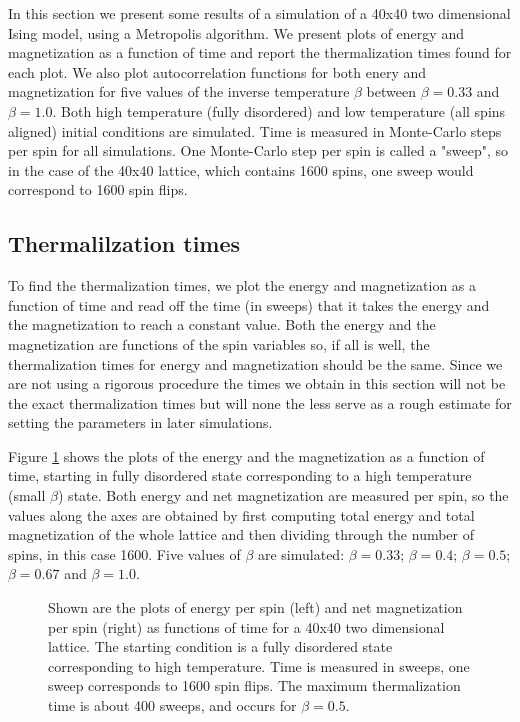 \documentclass[11pt,a4paper]{article}
\begin{document}
In this section we present some results of a simulation of a 40x40 two dimensional Ising model, using a Metropolis algorithm.
 We present plots of energy and magnetization as a function of time and report the thermalization times found for each plot.
 We also plot autocorrelation functions for both enery and magnetization
 for five values of the inverse temperature $\beta$ between $\beta = 0.33$ and $\beta = 1.0$. 
 Both high temperature (fully disordered) and low temperature (all spins aligned) initial conditions are simulated.
 Time is measured in Monte-Carlo steps per spin for all simulations. One Monte-Carlo step per spin is called a "sweep", so
 in the case of the 40x40 lattice, which contains 1600 spins, one sweep would correspond to 1600 spin flips. 




\subsection{Thermalilzation times}
To find the thermalization times, we plot the energy and magnetization as a function of time and read off the time (in sweeps) that
 it takes the energy and the magnetization to reach a constant value. Both the energy and the magnetization are functions of the spin
 variables so, if all is well, the thermalization times for energy and magnetization should be the same. 
 Since we are not using a rigorous procedure the times we obtain in this section will not be the exact thermalization times but will none 
 the less serve as a rough estimate for setting the parameters in later simulations. 

Figure \ref{fig:enmvt_false} shows the plots of the energy and the magnetization as a function of time, starting in fully disordered state 
 corresponding to a high temperature (small $\beta$) state. Both energy and net magnetization are measured per spin, so the values along
 the axes are obtained by first computing total energy and total magnetization of the whole lattice and then dividing through the number
 of spins, in this case 1600. Five values of $\beta$ are simulated: $\beta = 0.33$; $\beta = 0.4$;
 $\beta = 0.5$; $\beta = 0.67$ and $\beta = 1.0$. 


\begin{figure}[h!]
  \caption{Shown are the plots of energy per spin (left) and net magnetization per spin (right) as functions of time
    for a 40x40 two dimensional lattice. The starting condition is a fully
    disordered state corresponding to high temperature. Time is measured in sweeps, one sweep corresponds to 1600 spin
    flips. The maximum thermalization time is about 400 sweeps, and occurs for $\beta = 0.5$.}

\label{fig:enmvt_false}
\end{figure}
\end{document}
